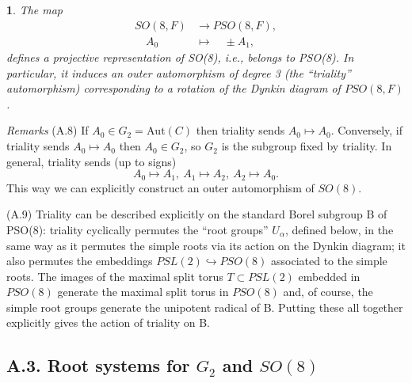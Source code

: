 \documentclass[12pt,letterpaper]{amsart}
\newcommand{\proclaimname}{}
\newtheorem*{proclaimx}{\proclaimname}
\newenvironment{proclaim}[1]%
  {\renewcommand{\proclaimname}{#1}\begin{proclaimx}}{\end{proclaimx}}
\begin{document}
\begin{proclaim}{Corollary A.7} The map
\[
\begin{split}
SO(8,F) &\rightarrow PSO(8,F),\\
\quad A_0 &\longmapsto \quad \pm A_1,
\end{split}
\]
defines a projective representation of SO(8), i.e., belongs to
PSO(8). In particular, it induces an outer automorphism of degree 3
(the ``triality'' automorphism)
corresponding to a rotation of the Dynkin diagram of $PSO(8,F)$.
\end{proclaim}

\noindent
\textit{Remarks} (A.8) If $A_0 \in G_2 = \text{Aut}(C)$ then triality sends
$A_0 \longmapsto A_0$. Conversely, if triality sends $A_0 \longmapsto A_0$
then $A_0 \in G_2$, so $G_2$ is the subgroup fixed by triality. In
general, triality sends (up to signs)
\[
A_0 \longmapsto A_1,\ A_1 \longmapsto A_2,\ A_2 \longmapsto A_0.
\]
This way we can explicitly construct an outer automorphism of $SO(8)$.

(A.9) Triality can be described explicitly on the standard Borel
subgroup B of PSO(8): triality cyclically permutes the ``root groups''
$U_{\alpha}$, defined below, in the same way as it permutes the simple roots
via its action on the Dynkin diagram; it also permutes the embeddings
$PSL(2) \hookrightarrow PSO(8)$ associated to the simple roots. The
images of the maximal split torus $T \subset PSL(2)$ embedded in $PSO(8)$
generate the maximal split torus in $PSO(8)$ and, of course, the simple
root groups generate the unipotent radical of B. Putting these all together
explicitly gives the action of triality on B.

\subsection*{A.3. Root systems for $G_2$ and $SO(8)$}
\end{document}
